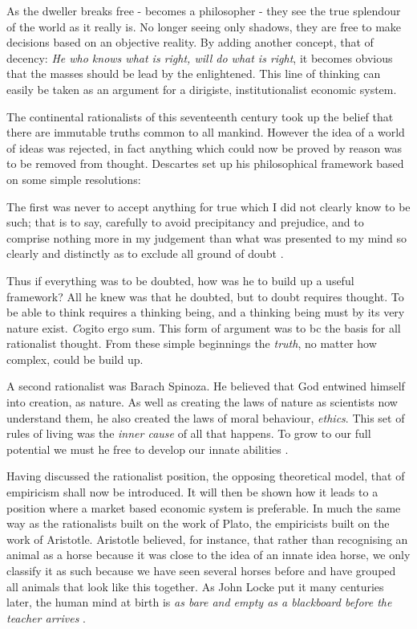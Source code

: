 As the dweller breaks free - becomes a philosopher - they see the true splendour of the world as it really is. No longer seeing only shadows, they are free to make decisions based on an objective reality. By adding another concept, that of decency: \textit{He who knows what is right, will do what is right}, it becomes obvious that the masses should be lead by the enlightened. This line of thinking can easily be taken as an argument for a dirigiste, institutionalist economic system.

The continental rationalists of this seventeenth century took up the belief that there are immutable truths common to all mankind. However the idea of a world of ideas was rejected, in fact anything which could now be proved by reason was to be removed from thought. Descartes set up his philosophical framework based on some simple resolutions:

\begin{displayquote}
The first was never to accept anything for true which I did not clearly know to be such; that is to say, carefully to avoid precipitancy and prejudice, and to comprise nothing more in my judgement than what was presented to my mind so clearly and distinctly as to exclude all ground of doubt \cite{Descartes:1637}.
\end{displayquote}

Thus if everything was to be doubted, how was he to build up a useful framework? All he knew was that he doubted, but to doubt requires thought. To be able to think requires a thinking being, and a thinking being must by its very nature exist. {\titlefont\textit Cogito ergo sum}. This form of argument was to bc the basis for all rationalist thought. From these simple beginnings the \textit{truth}, no matter how complex, could be build up.

A second rationalist was Barach Spinoza. He believed that God entwined himself into creation, as nature. As well as creating the laws of nature as scientists now understand them, he also created the laws of moral behaviour, \textit{ethics}. This set of rules of living was the \textit{inner cause} of all that happens. To grow to our full potential we must he free to develop our innate abilities \cite{Spinoza:1677}.

Having discussed the rationalist position, the opposing theoretical model, that of empiricism shall now be introduced. It will then be shown how it leads to a position where a market based economic system is preferable. In much the same way as the rationalists built on the work of Plato, the empiricists built on the work of Aristotle. Aristotle believed, for instance, that rather than recognising an animal as a horse because it was close to the idea of an innate idea horse, we only classify it as such because we have seen several horses before and have grouped all animals that look like this together. As John Locke put it many centuries later, the human mind at birth is \textit{as bare and empty as a blackboard before the teacher arrives} \cite{Locke:1689}.

